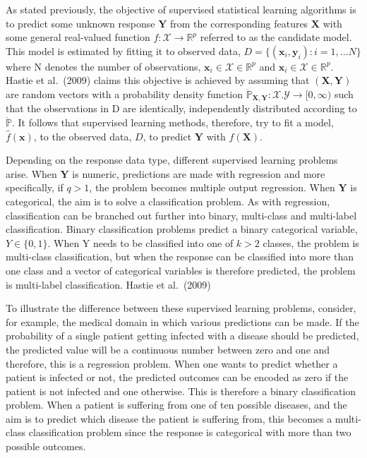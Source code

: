 \documentclass[11pt]{article}
\begin{document}
As stated previously, the objective of supervised statistical learning
algorithms is to predict some unknown response \(\mathbf{Y}\) from the
corresponding features \(\mathbf{X}\) with some general real-valued
function \(f:\mathcal{X}\rightarrow \mathbb{R}^p\) referred to as the
candidate model. This model is estimated by fitting it to observed data,
\(D=\{(\mathbf{x}_i,\mathbf{y}_i):i=1,...N\}\) where N denotes the
number of observations, \(\mathbf{x}_i\in\mathcal{X}\in\mathbb{R}^p\)
and \(\mathbf{x}_i\in\mathcal{X}\in\mathbb{R}^p\). Hastie et al.~(2009)
claims this objective is achieved by assuming that
\((\mathbf{X},\mathbf{Y})\) are random vectors with a probability
density function
\(\ddot{\mathbb{P}}_{\mathbf{X,Y}}:\mathcal{X}.\mathcal{Y}\rightarrow[0,\infty)\)
such that the observations in D are identically, independently
distributed according to \(\ddot{\mathbb{P}}\). It follows that
supervised learning methods, therefore, try to fit a model,
\(\hat{f}(\mathbf{x})\), to the observed data, \(D\), to predict
\(\mathbf{Y}\) with \(\hat{f}(\mathbf{X})\).

Depending on the response data type, different supervised learning
problems arise. When \(\mathbf{Y}\) is numeric, predictions are made
with regression and more specifically, if \(q>1\), the problem becomes
multiple output regression. When \(\mathbf{Y}\) is categorical, the aim
is to solve a classification problem. As with regression, classification
can be branched out further into binary, multi-class and multi-label
classification. Binary classification problems predict a binary
categorical variable, \(Y\in\{0,1\}\). When Y needs to be classified
into one of \(k>2\) classes, the problem is multi-class classification,
but when the response can be classified into more than one class and a
vector of categorical variables is therefore predicted, the problem is
multi-label classification. Hastie et al.~(2009)

To illustrate the difference between these supervised learning problems,
consider, for example, the medical domain in which various predictions
can be made. If the probability of a single patient getting infected
with a disease should be predicted, the predicted value will be a
continuous number between zero and one and therefore, this is a
regression problem. When one wants to predict whether a patient is
infected or not, the predicted outcomes can be encoded as zero if the
patient is not infected and one otherwise. This is therefore a binary
classification problem. When a patient is suffering from one of ten
possible diseases, and the aim is to predict which disease the patient
is suffering from, this becomes a multi-class classification problem
since the response is categorical with more than two possible outcomes.
\end{document}

